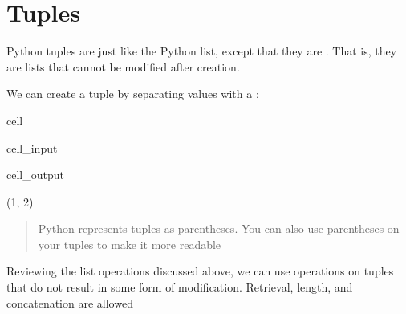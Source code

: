 \documentclass[letterpaper,10pt,english]{jupyterBook}
\begin{document}
\section{Tuples}
\label{\detokenize{datatypes:tuples}}
\sphinxAtStartPar
Python tuples are just like the Python list, except that they are . That is, they are lists that cannot be modified after creation.

\sphinxAtStartPar
We can create a tuple by separating values with a \sphinxcode{\sphinxupquote{,}}:

\begin{sphinxuseclass}{cell}\begin{sphinxVerbatimInput}

\begin{sphinxuseclass}{cell_input}
\begin{sphinxVerbatim}[commandchars=\\\{\}]
\end{sphinxVerbatim}

\end{sphinxuseclass}\end{sphinxVerbatimInput}
\begin{sphinxVerbatimOutput}

\begin{sphinxuseclass}{cell_output}
\begin{sphinxVerbatim}[commandchars=\\\{\}]
(1, 2)
\end{sphinxVerbatim}

\end{sphinxuseclass}\end{sphinxVerbatimOutput}

\end{sphinxuseclass}\begin{quote}

\sphinxAtStartPar
Python represents tuples as parentheses. You can also use parentheses on your tuples to make it more readable
\end{quote}

\sphinxAtStartPar
Reviewing the list operations discussed above, we can use operations on tuples that do not result in some form of modification. Retrieval, length, and concatenation are allowed
\end{document}
